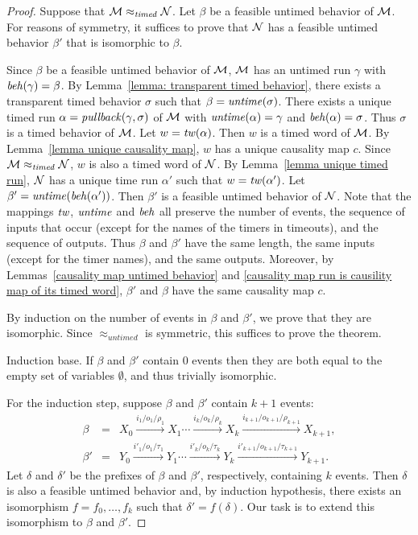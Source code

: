 \begin{proof}
Suppose that ${\mathcal M} \approx_{\mathit{timed}} {\mathcal N}$.
Let $\beta$ be a feasible untimed behavior of ${\mathcal M}$.
For reasons of symmetry, it suffices to prove that ${\mathcal N}$ has a feasible untimed behavior $\beta'$ that is isomorphic to $\beta$.

Since $\beta$ be a feasible untimed behavior of ${\mathcal M}$, ${\mathcal M}$ has an untimed run $\gamma$ with $\mathit{beh}(\gamma) = \beta$.
By Lemma~\ref{lemma: transparent timed behavior}, there exists a 
transparent timed behavior $\sigma$ such that $\beta = \mathit{untime}(\sigma)$.
There exists a unique timed run $\alpha = \mathit{pullback}(\gamma,\sigma)$ of ${\mathcal M}$ with $\mathit{untime}(\alpha) = \gamma$ and $\mathit{beh}(\alpha) = \sigma$.
Thus $\sigma$ is a timed behavior of ${\mathcal M}$.
Let  $w = \mathit{tw}(\alpha)$.
Then $w$ is a timed word of ${\mathcal M}$.
By Lemma~\ref{lemma unique causality map}, $w$ has a unique causality map $c$.
Since ${\mathcal M} \approx_{\mathit{timed}} {\mathcal N}$, $w$ is also a timed word of ${\mathcal N}$.
By Lemma~\ref{lemma unique timed run}, ${\mathcal N}$ has a unique time run $\alpha'$ such that $w = \mathit{tw}(\alpha')$.
Let $\beta' = \mathit{untime}(\mathit{beh}(\alpha'))$.
Then $\beta'$ is a feasible untimed behavior of ${\mathcal N}$.
Note that the mappings $\mathit{tw}$, $\mathit{untime}$ and $\mathit{beh}$ all preserve the number of events, the sequence of inputs that occur (except for the names of the timers in timeouts), and the sequence of outputs. Thus $\beta$ and $\beta'$ have the same length, the same inputs (except for the timer names), and the same outputs.
Moreover, by Lemmas~\ref{causality map untimed behavior} and \ref{causality map run is causility map of its timed word},
$\beta'$ and $\beta$ have the same causality map $c$.

By induction on the number of events in $\beta$ and $\beta'$, we prove that they are isomorphic.
Since $\approx_{\mathit{untimed}}$ is symmetric, this suffices to prove the theorem.

Induction base. If $\beta$ and $\beta'$ contain $0$ events then they are both equal to the empty set of variables $\emptyset$,
and thus trivially isomorphic.

For the induction step, suppose $\beta$ and $\beta'$ contain $k+1$ events:
\begin{eqnarray*}
\beta & = & X_0 \xrightarrow{i_1/o_1/\rho_1} X_1 \cdots \xrightarrow{i_k/o_k/\rho_k} X_{k}
 \xrightarrow{i_{k+1}/o_{k+1}/\rho_{k+1}} X_{k+1},\\
\beta' & = & Y_0 \xrightarrow{i'_1/o_1/\tau_1} Y_1  \cdots \xrightarrow{i'_k/o_k/\tau_k} Y_{k} 
 \xrightarrow{i'_{k+1}/o_{k+1}/\tau_{k+1}} Y_{k+1}.
\end{eqnarray*}
Let $\delta$ and $\delta'$ be the prefixes of $\beta$ and $\beta'$, respectively,
containing $k$ events. Then $\delta$ is also a feasible untimed behavior and, by
induction hypothesis, there exists an isomorphism $f = f_0 ,\ldots, f_k$ such that $\delta' = f(\delta)$.
Our task is to extend this isomorphism to $\beta$ and $\beta'$.


\end{proof}

